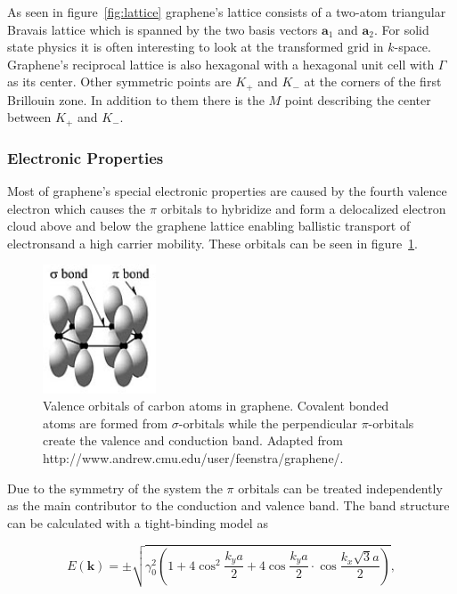 As seen in figure~\ref{fig:lattice} graphene's lattice consists of a two-atom triangular Bravais lattice which is spanned by the two basis vectors $\mathbf{a}_1$ and $\mathbf{a}_2$. For solid state physics it is often interesting to look at the transformed grid in $k$-space. Graphene's reciprocal lattice is also hexagonal with a hexagonal unit cell with $\Gamma$ as its center. Other symmetric points are $K_+$ and $K_-$ at the corners of the first Brillouin zone. In addition to them there is the $M$ point describing the center between $K_+$ and $K_-$.

\newpage

\subsubsection{Electronic Properties}

Most of graphene's special electronic properties are caused by the fourth valence electron which causes the $\pi$ orbitals to hybridize and form a delocalized electron cloud above and below the graphene lattice enabling ballistic transport of electrons\mcite and a high carrier mobility\mcite. These orbitals can be seen in figure~\ref{fig:orbitals}.

\begin{figure}[!h]
  \centering
  \includegraphics[width=0.3\textwidth]{./images/orbitals.jpg}
  \caption{Valence orbitals of carbon atoms in graphene. Covalent bonded atoms are formed from $\sigma$-orbitals while the perpendicular $\pi$-orbitals create the valence and conduction band. Adapted from http://www.andrew.cmu.edu/user/feenstra/graphene/\mcite.}
  \label{fig:orbitals}
\end{figure}

Due to the symmetry of the system the $\pi$ orbitals can be treated independently as the main contributor to the conduction and valence band. The band structure can be calculated with a tight-binding model as\mcite

\begin{equation}
  E(\mathbf{k})=\pm\sqrt{\gamma_0^2\left(1+4\cos^2\frac{k_ya}{2}+4\cos\frac{k_ya}{2}\cdot\cos\frac{k_x\sqrt{3}a}{2}\right)},
  \label{eq:dispersion}
\end{equation}


